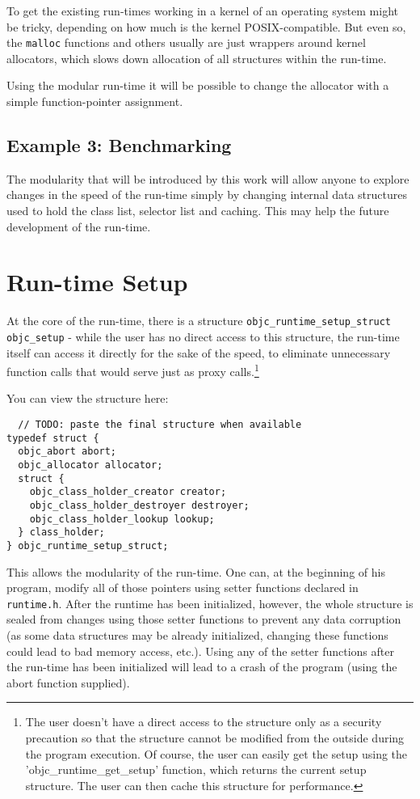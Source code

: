 To get the existing run-times working in a kernel of an operating system might be tricky, depending on how much is the kernel POSIX-compatible. But even so, the \verb=malloc= functions and others usually are just wrappers around kernel allocators, which slows down allocation of all structures within the run-time.

Using the modular run-time it will be possible to change the allocator with a simple function-pointer assignment.


\subsection{Example 3: Benchmarking}

The modularity that will be introduced by this work will allow anyone to explore changes in the speed of the run-time simply by changing internal data structures used to hold the class list, selector list and caching. This may help the future development of the run-time.


\section{Run-time Setup}

At the core of the run-time, there is a structure \verb=objc_runtime_setup_struct objc_setup= - while the user has no direct access to this structure, the run-time itself can access it directly for the sake of the speed, to eliminate unnecessary function calls that would serve just as proxy calls.\footnote{The user doesn't have a direct access to the structure only as a security precaution so that the structure cannot be modified from the outside during the program execution. Of course, the user can easily get the setup using the 'objc\_runtime\_get\_setup' function, which returns the current setup structure. The user can then cache this structure for performance.}

You can view the structure here:

\begin{verbatim}
  // TODO: paste the final structure when available
typedef struct {
  objc_abort abort;
  objc_allocator allocator;
  struct {
    objc_class_holder_creator creator;
    objc_class_holder_destroyer destroyer;
    objc_class_holder_lookup lookup;
  } class_holder;
} objc_runtime_setup_struct;
\end{verbatim}

This allows the modularity of the run-time. One can, at the beginning of his program, modify all of those pointers using setter functions declared in \verb=runtime.h=. After the runtime has been initialized, however, the whole structure is sealed from changes using those setter functions to prevent any data corruption (as some data structures may be already initialized, changing these functions could lead to bad memory access, etc.). Using any of the setter functions after the run-time has been initialized will lead to a crash of the program (using the abort function supplied).

